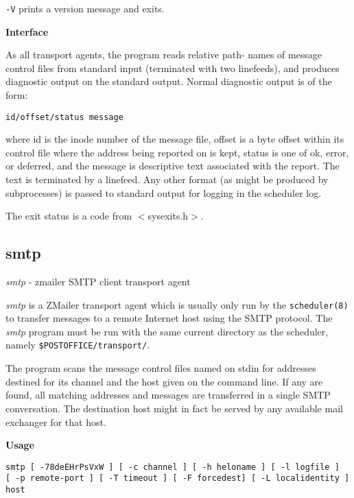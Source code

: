 {\tt -V} prints a version message and exits.

{\bf Interface}

As all transport agents, the program reads relative path-
names of message control files from standard input (terminated 
with two linefeeds), and produces diagnostic output
on the standard output. Normal diagnostic output is of
the form:

\begin{verbatim}
id/offset/status message
\end{verbatim}


where id is the inode number of the message file, offset
is a byte offset within its control file where the address
being reported on is kept, status is one of ok, error, or
deferred, and the message is descriptive text associated
with the report. The text is terminated by a linefeed.
Any other format (as might be produced by subprocesses) is
passed to standard output for logging in the scheduler
log.

The exit status is a code from {\(<\)}sysexits.h{\(>\)}.








\subsection{smtp}



{\em smtp\/} - zmailer SMTP client transport agent

{\em smtp\/} is a ZMailer transport agent which is usually only
run by the {\tt scheduler(8)} to transfer messages to a remote
Internet host using the SMTP protocol. The {\em smtp\/} program
must be run with the same current directory as the scheduler, 
namely {\tt \$POSTOFFICE/transport/}.

The program scans the message control files named on stdin
for addresses destined for its channel and the host given
on the command line. If any are found, all matching
addresses and messages are transferred in a single SMTP
conversation. The destination host might in fact be
served by any available mail exchanger for that host.

{\bf Usage}

\begin{verbatim}
smtp [ -78deEHrPsVxW ] [ -c channel ] [ -h heloname ] [ -l logfile ] 
[ -p remote-port ] [ -T timeout ] [ -F forcedest] [ -L localidentity ] host
\end{verbatim}

